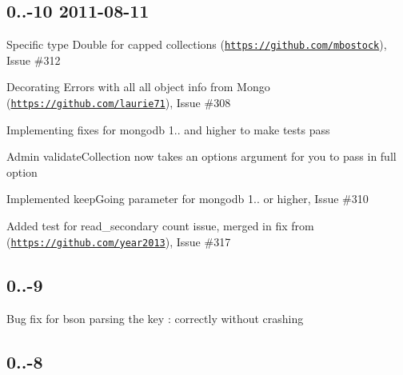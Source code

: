 \subsection*{0..-\/10 2011-\/08-\/11 }


\begin{DoxyItemize}
\item Specific type Double for capped collections (\href{https://github.com/mbostock}{\tt https\+://github.\+com/mbostock}), Issue \#312
\item Decorating Errors with all all object info from Mongo (\href{https://github.com/laurie71}{\tt https\+://github.\+com/laurie71}), Issue \#308
\item Implementing fixes for mongodb 1.. and higher to make tests pass
\item Admin validate\+Collection now takes an options argument for you to pass in full option
\item Implemented keep\+Going parameter for mongodb 1.. or higher, Issue \#310
\item Added test for read\+\_\+secondary count issue, merged in fix from (\href{https://github.com/year2013}{\tt https\+://github.\+com/year2013}), Issue \#317
\end{DoxyItemize}

\subsection*{0..-\/9 }


\begin{DoxyItemize}
\item Bug fix for bson parsing the key \textquotesingle{}\textquotesingle{}\+:\textquotesingle{}\textquotesingle{} correctly without crashing
\end{DoxyItemize}

\subsection*{0..-\/8 }



